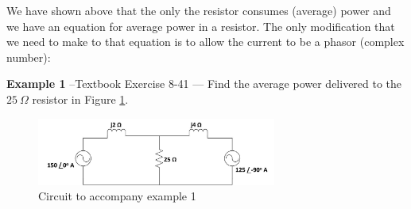 \documentclass{handout}
\begin{document}
We have shown above that the only the resistor consumes (average) power and we have an equation for average power in a resistor.  The only modification that we need to make to that equation is to allow the current to be a phasor (complex number):

\newpage
\clearpage
\pagebreak

\textbf{Example 1} --Textbook Exercise 8-41 --- Find the average power delivered to the $25\ \Omega$ resistor in Figure \ref{fig: Example1}.
\begin{figure} [h!]
\centering
\includegraphics[width=0.7\textwidth]{Example1.jpg}
\caption{Circuit to accompany example 1}
\label{fig: Example1}
\end{figure}



\newpage
\clearpage
\pagebreak
\end{document}
